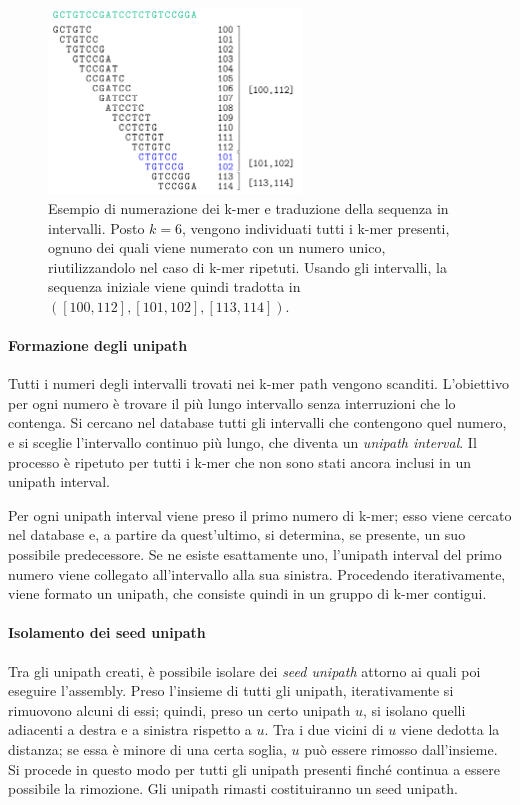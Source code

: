 \documentclass[crop=false, class=book]{standalone}
\begin{document}
	\begin{figure}
		\centering
		\includegraphics[width=0.6\textwidth]{capitoli/metodi analizzati/allpaths/numbering.png}
		\caption{Esempio di numerazione dei k-mer e traduzione della sequenza in intervalli. Posto $k=6$, vengono individuati tutti i k-mer presenti, ognuno dei quali viene numerato con un numero unico, riutilizzandolo nel caso di k-mer ripetuti. Usando gli intervalli, la sequenza iniziale viene quindi tradotta in $([100,112], [101, 102], [113, 114])$.}
		\label{fig:allpathsnumbering}
	\end{figure}
	
	\paragraph{Formazione degli unipath}
	Tutti i numeri degli intervalli trovati nei k-mer path vengono scanditi. L'obiettivo per ogni numero è trovare il più lungo intervallo senza interruzioni che lo contenga. Si cercano nel database tutti gli intervalli che contengono quel numero, e si sceglie l'intervallo continuo più lungo, che diventa un \textit{unipath interval}. Il processo è ripetuto per tutti i k-mer che non sono stati ancora inclusi in un unipath interval. 
	
	Per ogni unipath interval viene preso il primo numero di k-mer; esso viene cercato nel database e, a partire da quest'ultimo, si determina, se presente, un suo possibile predecessore. Se ne esiste esattamente uno, l'unipath interval del primo numero viene collegato all'intervallo alla sua sinistra. Procedendo iterativamente, viene formato un unipath, che consiste quindi in un gruppo di k-mer contigui. 
	
	\paragraph{Isolamento dei seed unipath}
	Tra gli unipath creati, è possibile isolare dei \textit{seed unipath} attorno ai quali poi eseguire l'assembly. Preso l'insieme di tutti gli unipath, iterativamente si rimuovono alcuni di essi; quindi, preso un certo unipath $u$, si isolano quelli adiacenti a destra e a sinistra rispetto a $u$. Tra i due vicini di $u$ viene dedotta la distanza; se essa è minore di una certa soglia, $u$ può essere rimosso dall'insieme. Si procede in questo modo per tutti gli unipath presenti finché continua a essere possibile la rimozione. Gli unipath rimasti costituiranno un seed unipath.
	
\end{document}
